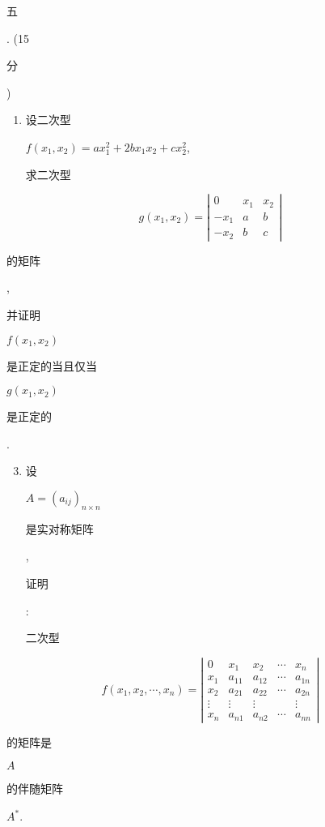 \documentclass[10pt]{article}
\begin{document}
\begin{CJK}{UTF8}{mj}五\end{CJK}. (15 \begin{CJK}{UTF8}{mj}分\end{CJK})

\begin{enumerate}
  \item \begin{CJK}{UTF8}{mj}设二次型\end{CJK} $f\left(x_{1}, x_{2}\right)=a x_{1}^{2}+2 b x_{1} x_{2}+c x_{2}^{2}$, \begin{CJK}{UTF8}{mj}求二次型\end{CJK}
\end{enumerate}
$$
g\left(x_{1}, x_{2}\right)=\left|\begin{array}{ccc}
0 & x_{1} & x_{2} \\
-x_{1} & a & b \\
-x_{2} & b & c
\end{array}\right|
$$
\begin{CJK}{UTF8}{mj}的矩阵\end{CJK}, \begin{CJK}{UTF8}{mj}并证明\end{CJK} $f\left(x_{1}, x_{2}\right)$ \begin{CJK}{UTF8}{mj}是正定的当且仅当\end{CJK} $g\left(x_{1}, x_{2}\right)$ \begin{CJK}{UTF8}{mj}是正定的\end{CJK}.

\begin{enumerate}
  \setcounter{enumi}{2}
  \item \begin{CJK}{UTF8}{mj}设\end{CJK} $A=\left(a_{i j}\right)_{n \times n}$ \begin{CJK}{UTF8}{mj}是实对称矩阵\end{CJK}, \begin{CJK}{UTF8}{mj}证明\end{CJK}: \begin{CJK}{UTF8}{mj}二次型\end{CJK}
\end{enumerate}
$$
f\left(x_{1}, x_{2}, \cdots, x_{n}\right)=\left|\begin{array}{ccccc}
0 & x_{1} & x_{2} & \cdots & x_{n} \\
x_{1} & a_{11} & a_{12} & \cdots & a_{1 n} \\
x_{2} & a_{21} & a_{22} & \cdots & a_{2 n} \\
\vdots & \vdots & \vdots & & \vdots \\
x_{n} & a_{n 1} & a_{n 2} & \cdots & a_{n n}
\end{array}\right|
$$
\begin{CJK}{UTF8}{mj}的矩阵是\end{CJK} $A$ \begin{CJK}{UTF8}{mj}的伴随矩阵\end{CJK} $A^{*}$.
\end{document}
